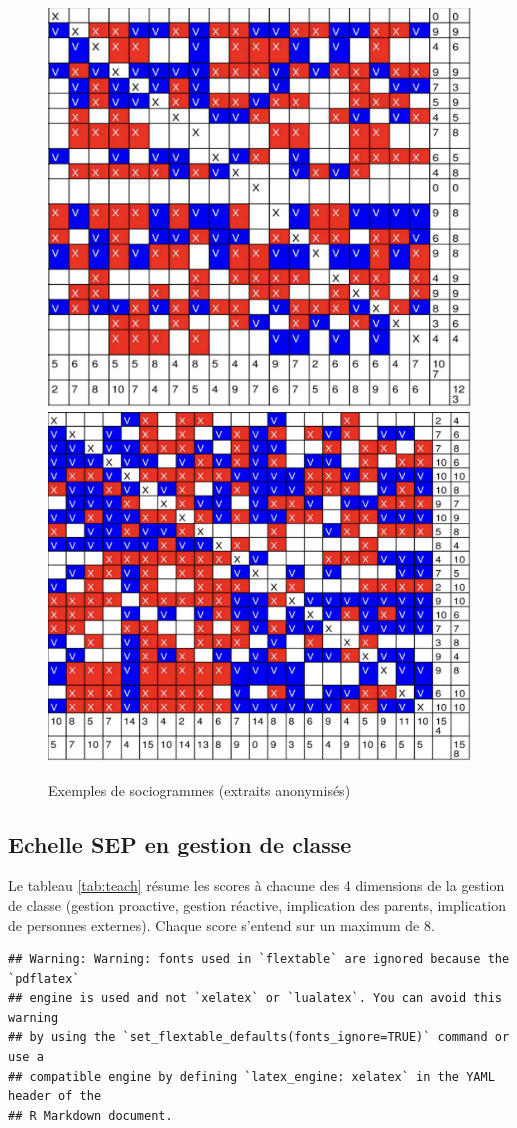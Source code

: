 \documentclass[
]{article}
\begin{document}
\begin{figure}

{\centering \includegraphics[width=0.4\linewidth]{peers/classe_a} \includegraphics[width=0.4\linewidth]{peers/classe_b} 

}

\caption{Exemples de sociogrammes (extraits anonymisés)}\label{fig:socio}
\end{figure}

\hypertarget{echelle-sep-en-gestion-de-classe}{%
\subsection{Echelle SEP en gestion de classe}\label{echelle-sep-en-gestion-de-classe}}

Le tableau \ref{tab:teach} résume les scores à chacune des 4 dimensions de la gestion de classe (gestion proactive, gestion réactive, implication des parents, implication de personnes externes). Chaque score s'entend sur un maximum de 8.

\begin{verbatim}
## Warning: Warning: fonts used in `flextable` are ignored because the `pdflatex`
## engine is used and not `xelatex` or `lualatex`. You can avoid this warning
## by using the `set_flextable_defaults(fonts_ignore=TRUE)` command or use a
## compatible engine by defining `latex_engine: xelatex` in the YAML header of the
## R Markdown document.
\end{verbatim}

\providecommand{\docline}[3]{\noalign{\global\setlength{\arrayrulewidth}{#1}}\arrayrulecolor[HTML]{#2}\cline{#3}}
\end{document}
